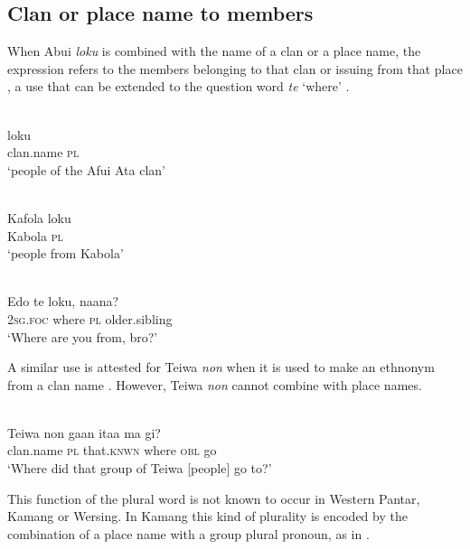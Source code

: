 \subsection{Clan or place name to members}
When Abui \textit{loku} is combined with the name of a clan or a place name, the expression refers to the members belonging to that clan  or issuing from that place , a use that can be extended to the question word \textit{te} `where' .


\ea%
\label{ex:9:79}
 \\
 loku \\
   clan.name \textsc{pl}  \\
\glt `people of the Afui Ata clan'
\z







\ea%
\label{ex:9:80}
 \\
\gll  Kafola  loku \\
    Kabola  \textsc{pl} \\
\glt `people from Kabola'
\z







\ea%
\label{ex:9:81}
 \\
\gll  Edo te loku, {naana?}\\
   \textsc{2sg.foc} where \textsc{pl} older.sibling \\
\glt `Where are you from, bro?'
\z






A similar use is attested for Teiwa \textit{non} when it is used to make an ethnonym from a clan name . However, Teiwa \textit{non} cannot combine with place names.


\ea%
\label{ex:9:82}
 \\
\gll  Teiwa non ga{{\textglotstop}}{an} {ita}{{\textglotstop}}{a} ma gi? \\
   clan.name \textsc{pl} that.\textsc{knwn} where \textsc{obl} go  \\
\glt `Where did that group of Teiwa [people] go to?'
\z






This function of the plural word is not known to occur in Western Pantar, Kamang or Wersing. In Kamang this kind of plurality is encoded by the combination of a place name with a group plural pronoun, as in .



